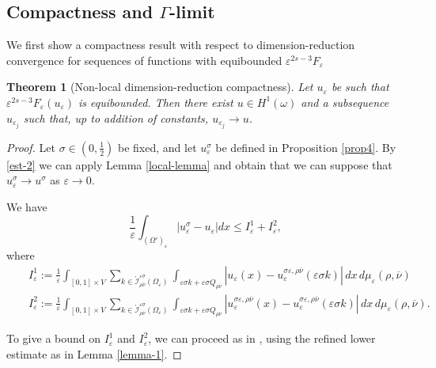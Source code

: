 \documentclass{article}
\newtheorem{theorem}[lemma]{Theorem}
\newcommand{\e}{\varepsilon}
\begin{document}
\subsection{Compactness and $\Gamma$-limit}

We first show a compactness result with respect to dimension-reduction convergence for sequences of functions with equibounded $\e^{2s-3} F_\e$

\begin{theorem}[Non-local dimension-reduction compactness]\label{nlcth}
 Let $u_\e$ be such that $\e^{2s-3} F_\e(u_\e)$ is equibounded. Then there exist $u\in H^1(\omega)$ and a subsequence $u_{\e_j}$ such that,  up to addition of constants, $u_{\e_j}\to u$.
\end{theorem}

\begin{proof} Let $\sigma\in (0,\tfrac12)$ be fixed, and let  $u^\sigma_\e$ be defined in Proposition \ref{prop4}.
By \eqref{est-2} we can apply Lemma \ref{local-lemma} and obtain that we can suppose that $u^\sigma_\e\to u^\sigma$ as $\e\to 0$. 

We have
\begin{equation}\label{claim-1}
\frac1\e\int_{(\Omega')_\e} |u^\sigma_\e-u_\e|dx\le I^1_\e+I^2_\e,
\end{equation}
where
\begin{eqnarray*}
   &&I^1_\e:= \frac1\e \int_{[0,1]\times V} \sum_{{k \in {\mathring{\mathcal I}}^{\e\sigma}_{\rho\overline{\nu}}(\Omega_\e)}} \int_{{\e\sigma}k+{\e\sigma}Q_{\rho\overline{\nu}}} |u_\e(x) - u^{\sigma\e,\rho\overline{\nu}}_\e(\e\sigma k)|\,dx\,d\mu_\e(\rho,\overline{\nu}) \\ \label{L1conv2}
&&I^2_\e:= \frac1\e \int_{[0,1]\times V} \sum_{{k \in {\mathring{\mathcal I}}^{\e\sigma}_{\rho\overline{\nu}}(\Omega_\e)}} \int_{{\e\sigma}k+{\e\sigma}Q_{\rho\overline{\nu}}} |u^{\sigma\e,\rho\overline{\nu}}_\e(x) - u^{\sigma\e,\rho\overline{\nu}}_\e(\e\sigma k)|\,dx\,d\mu_\e(\rho,\overline{\nu}).
\end{eqnarray*}

To give a bound on $I^1_\e$ and $I_\e^2$, we can proceed as in \cite[Section 3.1]{BBD}, using the refined lower estimate as in Lemma \ref{lemma-1}.



\end{proof}
\end{document}
